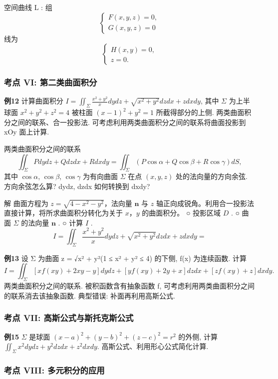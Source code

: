 空间曲线 L :
组
\[
\begin{cases}
F(x, y, z) = 0, \\
G(x, y, z) = 0
\end{cases}
\]
线为
\[
\begin{cases}
H(x, y) = 0, \\
z = 0.
\end{cases}
\]

\subsubsection*{考点 VI: 第二类曲面积分}


\textbf{例12}
计算曲面积分 \(I = \iint_{\Sigma} \frac{x^2 + y^2}{x} dy dz + \sqrt{x^2 + y^2} dz dx + z dx dy\), 其中 \(\Sigma\) 为上半球面 \(x^2 + y^2 + z^2 = 4\) 被柱面 \((x-1)^2 + y^2 = 1\) 所截得部分的上侧.
两类曲面积分之间的联系、合一投影法.
可考虑利用两类曲面积分之间的联系将曲面投影到 xOy 面上计算.

两类曲面积分之间的联系
\[ \iint_{\Sigma} P dy dz + Q dz dx + R dx dy = \iint_{\Sigma} (P \cos \alpha + Q \cos \beta + R \cos \gamma) dS, \]
其中 \(\cos \alpha\), \(\cos \beta\), \(\cos \gamma\) 为有向曲面 \(\Sigma\) 在点 \((x, y, z)\) 处的法向量的方向余弦.
方向余弦怎么算? dydz, dzdx 如何转换到 dxdy?

解 曲面方程为 \(z = \sqrt{4 - x^2 - y^2}\)，法向量 \(\mathbf{n}\) 与 \(z\) 轴正向成锐角。利用合一投影法直接计算，将所求曲面积分转化为关于 \(x\)，\(y\) 的曲面积分。
○ 投影区域 \(D\) .
○ 曲面 \(\Sigma\) 的法向量 \(\mathbf{n}\) .
○ 计算 \(I\) .
\[I = \iint_{\Sigma} \frac{x^2 + y^2}{x} dy dz + \sqrt{x^2 + y^2} dz dx + z dx dy =\]

\textbf{例13}
设 Σ 为曲面 z = √x² + y²(1 ≤ x² + y² ≤ 4) 的下侧, f(x) 为连续函数. 计算
\[I = \iint_{\Sigma} [xf(xy) + 2xy - y] dy dz + [yf(xy) + 2y + x] dz dx + [zf(xy) + z] dx dy.\]
两类曲面积分之间的联系.
被积函数含有抽象函数 f, 可考虑利用两类曲面积分之间的联系消去该抽象函数.
典型错误: 补面再利用高斯公式.


\subsubsection*{考点 VII: 高斯公式与斯托克斯公式}


\textbf{例15}
\(\Sigma\) 是球面 \((x-a)^2 + (y-b)^2 + (z-c)^2 = r^2\) 的外侧, 计算 \(\iint_{\Sigma} x^2 dy dz + y^2 dz dx + z^2 dx dy.\)
高斯公式、利用形心公式简化计算.

\subsubsection*{考点 VIII: 多元积分的应用}


